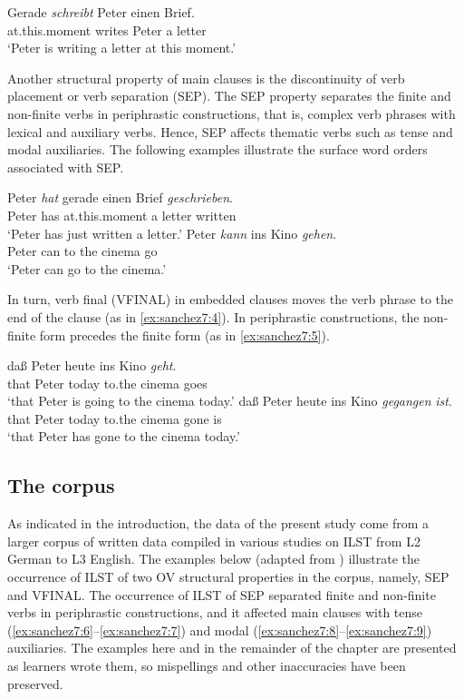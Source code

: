 \documentclass[output=paper,modfonts,nonflat, newtxmath]{langsci/langscibook}
\begin{document}
\ea%
  \label{ex:sanchez7:1}
  \gll Gerade \textit{schreibt} Peter einen Brief.\\
    at.this.moment writes Peter a letter\\
  \glt `Peter is writing a letter at this moment.’
  \z

Another structural property of main clauses is the discontinuity of verb placement or verb separation (SEP). The SEP property separates the finite and non-finite verbs in periphrastic constructions, that is, complex verb phrases with lexical and auxiliary verbs. Hence, SEP affects thematic verbs such as tense  and modal  auxiliaries. The following examples illustrate the surface word orders associated with SEP.

\ea%
  \label{ex:sanchez7:2}
  \gll Peter  \textit{hat} gerade  einen Brief  \textit{geschrieben}.  \\
    Peter has at.this.moment a letter written \\
  \glt ‘Peter has just written a letter.’
\ex %
  \label{ex:sanchez7:3}
  \gll Peter  \textit{kann} ins Kino  \textit{gehen}.  \\
    Peter can to the cinema go\\
  \glt ‘Peter can go to the cinema.’
\z


In turn, verb final (VFINAL) in embedded clauses moves the verb phrase to the end of the clause (as in \ref{ex:sanchez7:4}). In periphrastic constructions, the non-finite form precedes the finite form (as in \ref{ex:sanchez7:5}).

\ea%
  \label{ex:sanchez7:4}
  \gll  daß Peter heute ins Kino  \textit{geht}.   \\
    that Peter today to.the cinema  goes\\
  \glt ‘that Peter is going to the cinema today.’
\ex %
  \label{ex:sanchez7:5}
  \gll daß  Peter  heute  ins Kino  \textit{gegangen}  \textit{ist}.\\
    that  Peter  today  to.the cinema  gone is \\
  \glt ‘that Peter has gone to the cinema today.’
  \z

\subsection{The corpus} %


As indicated in the introduction, the data of the present study come from a larger corpus of written data compiled in various studies on ILST from L2 German to L3 English. The examples below (adapted from \citealt{Sánchez2011, Sánchez2015Background, Sánchez2016}) illustrate the occurrence of ILST of two OV structural properties in the corpus, namely, SEP and VFINAL. The occurrence of ILST of SEP separated finite and non-finite verbs in periphrastic constructions, and it affected main clauses with tense (\ref{ex:sanchez7:6}--\ref{ex:sanchez7:7}) and modal (\ref{ex:sanchez7:8}--\ref{ex:sanchez7:9}) auxiliaries. The examples here and in the remainder of the chapter are presented as learners wrote them, so mispellings and other inaccuracies have been preserved.
\end{document}
